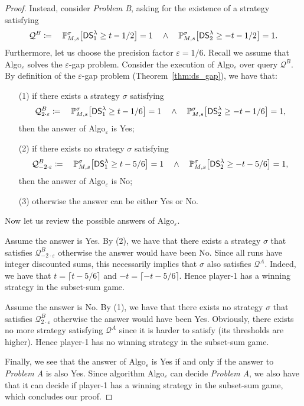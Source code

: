 \documentclass{llncs}
\newcommand{\strat}{\ensuremath{\sigma} }
\newcommand*{\pr}{\mathbb{P}}
\newcommand{\discSum}[1]{\ensuremath{{\sf DS}^{#1}} }
\newcommand{\discount}{\ensuremath{\lambda} }
\newcommand{\query}{\ensuremath{\mathcal{Q}} }
\begin{document}
\begin{proof}
Instead, consider \textit{Problem B}, asking for the existence of a strategy satisfying
\begin{equation*}
\query^{B} \coloneqq \quad \pr_{M,s}^\strat \big[\discSum{\discount}_{1} \geq t - 1/2\big] = 1\quad \wedge \quad \pr_{M,s}^\strat \big[\discSum{\discount}_{2} \geq -t - 1/2\big] = 1.
\end{equation*}
Furthermore, let us choose the precision factor $\varepsilon = 1/6$. Recall we assume that \textsf{Algo}$_{\varepsilon}$ solves the $\varepsilon$-gap problem. Consider the execution of \textsf{Algo}$_{\varepsilon}$ over query $\query^{B}$. By definition of the $\varepsilon$-gap problem (Theorem~\ref{thm:ds_gap}), we have that:
\begin{itemize}
\item[(1)] if there exists a strategy $\strat$ satisfying
\begin{equation*}
\query^{B}_{2\cdot\varepsilon} \coloneqq \quad \pr_{M,s}^\strat \big[\discSum{\discount}_{1} \geq t - 1/6\big] = 1\quad \wedge \quad \pr_{M,s}^\strat \big[\discSum{\discount}_{2} \geq -t - 1/6\big] = 1,
\end{equation*}
then the answer of \textsf{Algo}$_{\varepsilon}$ is \textsf{Yes};
\item[(2)] if there exists no strategy $\strat$ satisfying
\begin{equation*}
\query^{B}_{-2\cdot\varepsilon} \coloneqq \quad \pr_{M,s}^\strat \big[\discSum{\discount}_{1} \geq t - 5/6\big] = 1\quad \wedge \quad \pr_{M,s}^\strat \big[\discSum{\discount}_{2} \geq -t - 5/6\big] = 1,
\end{equation*}
then the answer of \textsf{Algo}$_{\varepsilon}$ is \textsf{No};
\item[(3)] otherwise the answer can be either \textsf{Yes} or \textsf{No}.
\end{itemize}
Now let us review the possible answers of \textsf{Algo}$_{\varepsilon}$.

Assume the answer is \textsf{Yes}. By (2), we have that there exists a strategy $\strat$ that satisfies $\query^{B}_{-2\cdot\varepsilon}$ otherwise the answer would have been \textsf{No}. Since all runs have integer discounted sums, this necessarily implies that $\strat$ also satisfies $\query^{A}$. Indeed, we have that $t = \lceil t-5/6\rceil$ and $-t = \lceil -t-5/6\rceil$. Hence player-1 has a winning strategy in the subset-sum game.

Assume the answer is \textsf{No}. By (1), we have that there exists no strategy $\strat$ that satisfies $\query^{B}_{2\cdot\varepsilon}$ otherwise the answer would have been \textsf{Yes}. Obviously, there exists no more strategy satisfying $\query^{A}$ since it is harder to satisfy (its thresholds are higher). Hence player-1 has no winning strategy in the subset-sum game.

Finally, we see that the answer of \textsf{Algo}$_{\varepsilon}$ is \textsf{Yes} if and only if the answer to \textit{Problem A} is also \textsf{Yes}. Since algorithm \textsf{Algo}$_{\varepsilon}$ can decide \textit{Problem A}, we also have that it can decide if player-1 has a winning strategy in the subset-sum game, which concludes our proof.
\end{proof}
\end{document}
